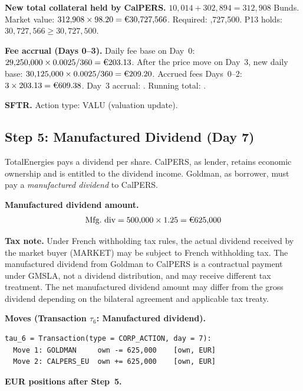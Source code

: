 \documentclass[11pt,a4paper]{article}
\newcommand{\EUR}[1]{\texteuro#1}
\begin{document}
\noindent\textbf{New total collateral held by CalPERS.} $10{,}014 + 302{,}894 = 312{,}908$ Bunds. Market value: $312{,}908 \times 98.20 = \text{\EUR{30,727,566}}$. Required: \EUR{30,727,500}. P13 holds: $30{,}727{,}566 \geq 30{,}727{,}500$. \checkmark

\noindent\textbf{Fee accrual (Days 0--3).} Daily fee base on Day~0: $29{,}250{,}000 \times 0.0025 / 360 = \text{\EUR{203.13}}$. After the price move on Day~3, new daily base: $30{,}125{,}000 \times 0.0025 / 360 = \text{\EUR{209.20}}$. Accrued fees Days~0--2: $3 \times 203.13 = \text{\EUR{609.38}}$. Day~3 accrual: \EUR{209.20}. Running total: \EUR{818.58}.

\noindent\textbf{SFTR.} Action type: VALU (valuation update).

\subsection{Step 5: Manufactured Dividend (Day 7)}
\label{sec:eu-step5}

TotalEnergies pays a \EUR{1.25} dividend per share. CalPERS, as lender, retains economic ownership and is entitled to the dividend income. Goldman, as borrower, must pay a \emph{manufactured dividend} to CalPERS.

\medskip
\noindent\textbf{Manufactured dividend amount.}
\[
\text{Mfg.\ div} = 500{,}000 \times 1.25 = \text{\EUR{625,000}}
\]

\noindent\textbf{Tax note.} Under French withholding tax rules, the actual dividend received by the market buyer (MARKET) may be subject to French withholding tax. The manufactured dividend from Goldman to CalPERS is a contractual payment under GMSLA, not a dividend distribution, and may receive different tax treatment. The net manufactured dividend amount may differ from the gross dividend depending on the bilateral agreement and applicable tax treaty.

\medskip
\noindent\textbf{Moves (Transaction $\tau_6$: Manufactured dividend).}

\begin{lstlisting}
tau_6 = Transaction(type = CORP_ACTION, day = 7):
  Move 1: GOLDMAN     own -= 625,000    [own, EUR]
  Move 2: CALPERS_EU  own += 625,000    [own, EUR]
\end{lstlisting}

\noindent\textbf{EUR positions after Step~5.}
\end{document}
